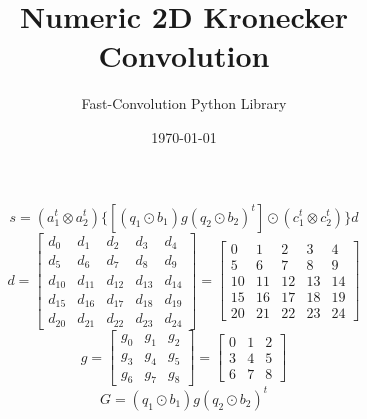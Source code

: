 \documentclass{article}%
\title{Numeric 2D Kronecker Convolution}%
\author{Fast{-}Convolution Python Library}%
\date{\today}%
\begin{document}
%
\normalsize%
\maketitle%
\[%
s=(a_1^t \otimes a_2^t) \{[(q_1 \odot b_1) g (q_2 \odot b_2)^t] \odot (c_1^t \otimes c_2^t)\} d%
\]%
\[%
d = \left[\begin{matrix}d_{0} & d_{1} & d_{2} & d_{3} & d_{4}\\d_{5} & d_{6} & d_{7} & d_{8} & d_{9}\\d_{10} & d_{11} & d_{12} & d_{13} & d_{14}\\d_{15} & d_{16} & d_{17} & d_{18} & d_{19}\\d_{20} & d_{21} & d_{22} & d_{23} & d_{24}\end{matrix}\right] = \left[\begin{matrix}0 & 1 & 2 & 3 & 4\\5 & 6 & 7 & 8 & 9\\10 & 11 & 12 & 13 & 14\\15 & 16 & 17 & 18 & 19\\20 & 21 & 22 & 23 & 24\end{matrix}\right]%
\]%
\[%
g = \left[\begin{matrix}g_{0} & g_{1} & g_{2}\\g_{3} & g_{4} & g_{5}\\g_{6} & g_{7} & g_{8}\end{matrix}\right] = \left[\begin{matrix}0 & 1 & 2\\3 & 4 & 5\\6 & 7 & 8\end{matrix}\right]%
\]%
\[%
G = (q_1 \odot b_1) g (q_2 \odot b_2)^t%
\]%
\end{document}
